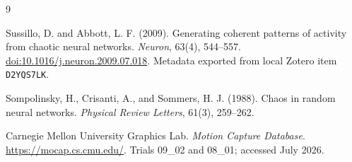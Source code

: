 \begin{thebibliography}{9}

Sussillo, D. and Abbott, L. F. (2009).
Generating coherent patterns of activity from chaotic neural networks.
\textit{Neuron}, 63(4), 544--557.
\href{https://doi.org/10.1016/j.neuron.2009.07.018}{doi:10.1016/j.neuron.2009.07.018}.
Metadata exported from local Zotero item \texttt{D2YQS7LK}.

Sompolinsky, H., Crisanti, A., and Sommers, H. J. (1988).
Chaos in random neural networks.
\textit{Physical Review Letters}, 61(3), 259--262.

Carnegie Mellon University Graphics Lab.
\textit{Motion Capture Database}.
\url{https://mocap.cs.cmu.edu/}.
Trials 09\_02 and 08\_01; accessed July 2026.

\end{thebibliography}
